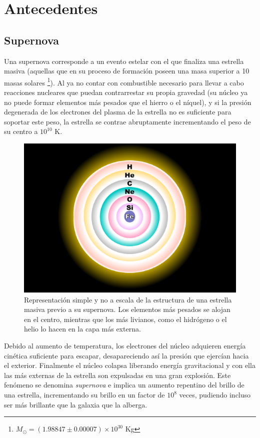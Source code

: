 \chapter{Antecedentes}
\label{ch:background}

\section{Supernova}
Una supernova corresponde a un evento estelar con el que finaliza una estrella masiva (aquellas que en su proceso de formaci\'on poseen una masa superior a 10 masas solares \footnote{$M_{\odot} = (1.98847 \pm 0.00007) \times 10^{30}$ Kg}). Al ya no contar con combustible necesario para llevar a cabo reacciones nucleares que puedan contrarrestar su propia gravedad (su n\'ucleo ya no puede formar elementos m\'as pesados que el hierro o el n\'iquel), y si la presi\'on degenerada de los electrones del plasma de la estrella no es suficiente para soportar este peso, la estrella se contrae abruptamente incrementando el peso de su centro a $10^{10}$ K.
\bigskip

\begin{figure}[h!]
\centering
\includegraphics[scale=.25]{images/sncore}
\caption{Representaci\'on simple y no a escala de la estructura de una estrella masiva previo a su supernova. Los elementos m\'as pesados se alojan en el centro, mientras que  los m\'as livianos, como el hidr\'ogeno o el helio lo hacen en la capa m\'as externa.}
\label{fig:f0}
\end{figure}


Debido al aumento de temperatura, los electrones del n\'ucleo adquieren energ\'ia cin\'etica suficiente para escapar, desapareciendo as\'i la presi\'on que ejerc\'ian hacia el exterior. Finalmente el n\'ucleo colapsa liberando energ\'ia gravitacional y con ella las m\'as externas de la estrella son expulsadas en una gran explosi\'on. Este fen\'omeno se denomina \textit{supernova} e implica un aumento repentino del brillo de una estrella, incrementando su brillo en un factor de $10^8$ veces, pudiendo incluso ser m\'as brillante que la galaxia que la alberga.
\bigskip

